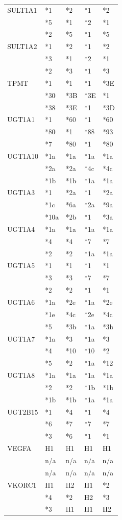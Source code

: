 \documentclass{report}
\begin{document}
\begin{tabularx}{\textwidth}{ X | XXXX }
\midrule
SULT1A1
& *1 & *2 & *1 & *2 \\
& *5 & *1 & *2 & *1  \\
& *2 & *5 & *1 & *5 \\
\midrule
SULT1A2
& *1 & *2 & *1 & *2 \\
& *3 & *1 & *2 & *1  \\
& *2 & *3 & *1 & *3 \\
\midrule
TPMT
& *1 & *1 & *1 & *3E \\
& *30 & *3B & *3E & *1  \\
& *38 & *3E & *1 & *3D \\
\midrule
UGT1A1
& *1 & *60 & *1 & *60 \\
& *80 & *1 & *88 & *93  \\
& *7 & *80 & *1 & *80 \\
\midrule
UGT1A10
& *1a & *1a & *1a & *1a \\
& *2a & *2a & *4c & *4c  \\
& *1b & *1b & *1a & *1a \\
\midrule
UGT1A3
& *1 & *2a & *1 & *2a \\
& *1c & *6a & *2a & *9a  \\
& *10a & *2b & *1 & *3a \\
\midrule
UGT1A4
& *1a & *1a & *1a & *1a \\
& *4 & *4 & *7 & *7  \\
& *2 & *2 & *1a & *1a \\
\midrule
UGT1A5
& *1 & *1 & *1 & *1 \\
& *3 & *3 & *7 & *7  \\
& *2 & *2 & *1 & *1 \\
\midrule
UGT1A6
& *1a & *2e & *1a & *2e \\
& *1e & *4c & *2e & *4c  \\
& *5 & *3b & *1a & *3b \\
\midrule
UGT1A7
& *1a & *3 & *1a & *3 \\
& *4 & *10 & *10 & *2  \\
& *5 & *2 & *1a & *12 \\
\midrule
UGT1A8
& *1a & *1a & *1a & *1a \\
& *2 & *2 & *1b & *1b  \\
& *1b & *1b & *1a & *1a \\
\midrule
UGT2B15
& *1 & *4 & *1 & *4 \\
& *6 & *7 & *7 & *7  \\
& *3 & *6 & *1 & *1 \\
\midrule
VEGFA
& H1 & H1 & H1 & H1 \\
& n/a & n/a & n/a & n/a  \\
& n/a & n/a & n/a & n/a \\
\midrule
VKORC1
& H1 & H2 & H1 & *2 \\
& *4 & *2 & H2 & *3  \\
& *3 & H1 & H1 & H2 \\
\bottomrule
\end{tabularx}
\normalsize
\newpage
\end{document}
